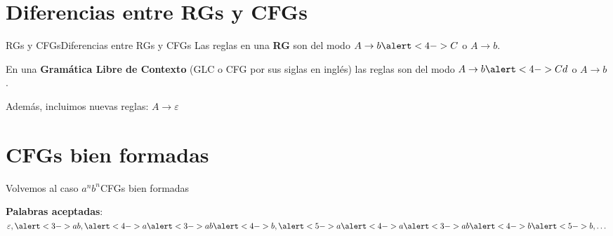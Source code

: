 \documentclass[spanish]{beamer}
\begin{document}
\section{Diferencias entre RGs y CFGs}

\begin{frame}{RGs y CFGs}{Diferencias entre RGs y CFGs}
    Las \alert{reglas} en una \textbf{RG} son del modo $A \to b\alert<4->{C}$ o $A \to b$. \pause

    \bigskip

    En una \textbf{Gramática Libre de Contexto} (GLC o CFG por sus siglas en inglés) las reglas son del modo $A \to b\alert<4->{C}d$ o $A \to b$. \pause

    \bigskip

    Además, incluimos nuevas reglas: $A \to \varepsilon$ \pause
\end{frame}

\section{CFGs bien formadas}

\begin{frame}{Volvemos al caso $a^nb^n$}{CFGs bien formadas}

    \textbf{Palabras aceptadas}: $\varepsilon, \alert<3->{ab}, \alert<4->{a}\alert<3->{ab}\alert<4->{b}, \alert<5->a\alert<4->{a}\alert<3->{ab}\alert<4->{b}\alert<5->{b}, \dots$ \pause

    \bigskip



    \bigskip

    
\end{frame}
\end{document}
